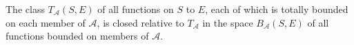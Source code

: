 The class $T_{\mathcal{A}}(S,E)$ of all functions on $S$ to $E$, each of which is totally bounded on each member of $\mathcal{A}$, is closed relative to $T_{\mathcal{A}}$ in the space $B_{\mathcal{A}}(S,E)$ of all functions bounded on members of $\mathcal{A}$.
